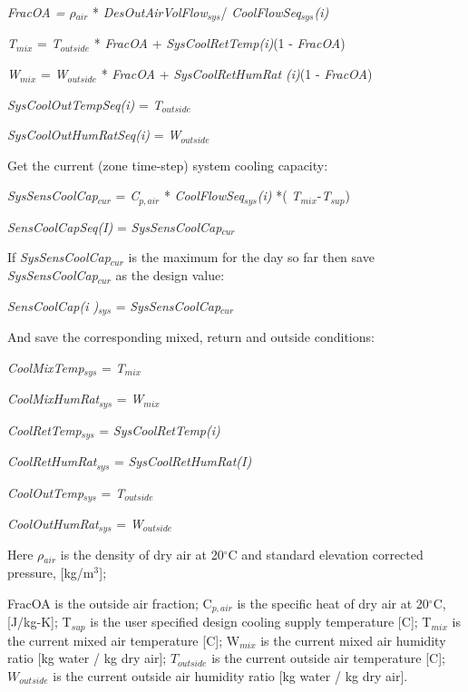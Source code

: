 \emph{FracOA = $\rho$\(_{air}\)} * \emph{DesOutAirVolFlow\(_{sys}\)}/ \emph{CoolFlowSeq\(_{sys}\)(i)}

\emph{T\(_{mix}\)} = \emph{T\(_{outside}\)} * \emph{FracOA} + \emph{SysCoolRetTemp(i)}(1 - \emph{FracOA})

\emph{W\(_{mix}\)} = \emph{W\(_{outside}\)} * \emph{FracOA} + \emph{SysCoolRetHumRat (i)}(1 - \emph{FracOA})

\emph{SysCoolOutTempSeq(i)} = \emph{T\(_{outside}\)}

\emph{SysCoolOutHumRatSeq(i)} = \emph{W\(_{outside}\)}

Get the current (zone time-step) system cooling capacity:

\emph{SysSensCoolCap\(_{cur}\)} = \emph{C\(_{p,air}\)} * \emph{CoolFlowSeq\(_{sys}\)(i)} *( \emph{T\(_{mix}\)}-\emph{T\(_{sup}\)})

\emph{SensCoolCapSeq(I)} = \emph{SysSensCoolCap\(_{cur}\)}

If \emph{SysSensCoolCap\(_{cur}\)} is the maximum for the day so far then save \emph{SysSensCoolCap\(_{cur}\)} as the design value:

\emph{SensCoolCap(i )\(_{sys}\)} = \emph{SysSensCoolCap\(_{cur}\)}

And save the corresponding mixed, return and outside conditions:

\emph{CoolMixTemp\(_{sys}\)} = \emph{T\(_{mix}\)}

\emph{CoolMixHumRat\(_{sys}\)} = \emph{W\(_{mix}\)}

\emph{CoolRetTemp\(_{sys}\)} = \emph{SysCoolRetTemp(i)}

\emph{CoolRetHumRat\(_{sys}\)} = \emph{SysCoolRetHumRat(I)}

\emph{CoolOutTemp\(_{sys}\)} = \emph{T\(_{outside}\)}

\emph{CoolOutHumRat\(_{sys}\)} = \emph{W\(_{outside}\)}

Here $\rho$\(_{air}\) is the density of dry air at 20\(^{\circ}\)C and standard elevation corrected pressure, {[}kg/m\(^{3}\){]};

{\setlength\parindent{25pt} FracOA is the outside air fraction; }
{\setlength\parindent{25pt} C\(_{p,air}\) is the specific heat of dry air at 20\(^{\circ}\)C, {[}J/kg-K{]}; }
{\setlength\parindent{25pt} T\(_{sup}\) is the user specified design cooling supply temperature {[}C{]}; }
{\setlength\parindent{25pt} T\(_{mix}\) is the current mixed air temperature {[}C{]}; }
{\setlength\parindent{25pt} W\(_{mix}\) is the current mixed air humidity ratio {[}kg water / kg dry air{]}; }
{\setlength\parindent{25pt} \(T_{outside}\) is the current outside air temperature {[}C{]}; }
{\setlength\parindent{25pt} \(W_{outside}\) is the current outside air humidity ratio {[}kg water / kg dry air{]}. }

